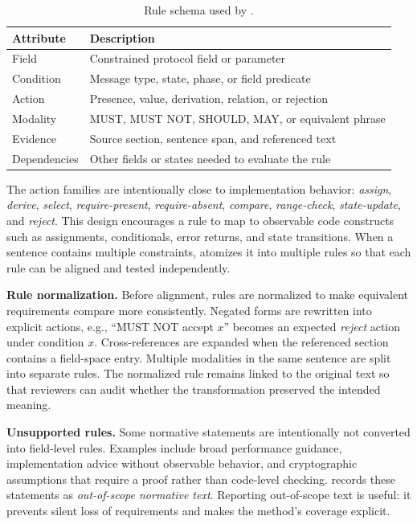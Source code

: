 \begin{table}[t]
\centering
\caption{Rule schema used by \tool.}
\label{tab:ruleschema}
\small
\begin{tabular}{lp{}}
\toprule
\textbf{Attribute} & \textbf{Description} \\
\midrule
Field & Constrained protocol field or parameter \\
Condition & Message type, state, phase, or field predicate \\
Action & Presence, value, derivation, relation, or rejection \\
Modality & MUST, MUST NOT, SHOULD, MAY, or equivalent phrase \\
Evidence & Source section, sentence span, and referenced text \\
Dependencies & Other fields or states needed to evaluate the rule \\
\bottomrule
\end{tabular}
\end{table}

The action families are intentionally close to implementation behavior:
\emph{assign}, \emph{derive}, \emph{select}, \emph{require-present},
\emph{require-absent}, \emph{compare}, \emph{range-check},
\emph{state-update}, and \emph{reject}. This design encourages a rule to map to
observable code constructs such as assignments, conditionals, error returns, and
state transitions. When a sentence contains multiple constraints, \tool{}
atomizes it into multiple rules so that each rule can be aligned and tested
independently.

\textbf{Rule normalization.}
Before alignment, rules are normalized to make equivalent requirements compare
more consistently. Negated forms are rewritten into explicit actions, e.g.,
``MUST NOT accept $x$'' becomes an expected \emph{reject} action under condition
$x$. Cross-references are expanded when the referenced section contains a
field-space entry. Multiple modalities in the same sentence are split into
separate rules. The normalized rule remains linked to the original text so that
reviewers can audit whether the transformation preserved the intended meaning.

\textbf{Unsupported rules.}
Some normative statements are intentionally not converted into field-level
rules. Examples include broad performance guidance, implementation advice
without observable behavior, and cryptographic assumptions that require a proof
rather than code-level checking. \tool{} records these statements as
\emph{out-of-scope normative text}. Reporting out-of-scope text is useful: it
prevents silent loss of requirements and makes the method's coverage explicit.

